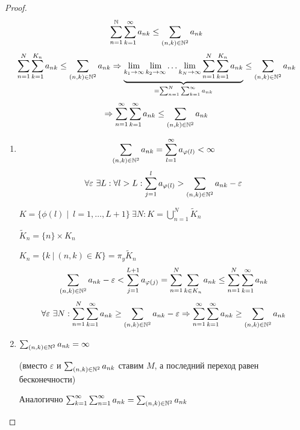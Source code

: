     \begin{proof}
        \[
            \sum_{n=1}^{\mathbb{N}} \sum_{k=1}^\infty a_{nk} \le \sum_{(n, k) \in \mathbb{N}^2} a_{nk}    
        \]
        \[
            \sum_{n=1}^N \sum_{k=1}^{K_n} a_{nk} \le \sum_{(n, k) \in \N^2} a_{nk} \Rightarrow %
            \underbrace{\lim_{k_1\to\infty}\lim_{k_2\to\infty}\dotsc\lim_{k_N\to\infty} \sum^N_{n=1}\sum^{K_n}_{k=1} a_{nk}}_{ = \sum^N_{n=1}\sum^\infty_{k=1}a_{nk}}
            \le \sum_{(n, k) \in \N^2} a_{nk}
        \]
        \[
            \Rightarrow \sum_{n=1}^\infty \sum_{k=1}^\infty a_{nk} \le \sum_{(n, k) \in \mathbb{N}^2} a_{nk}  
        \]

        \begin{enumerate}
            \item \[
                \sum_{(n, k) \in \mathbb{N}^2} a_{nk} = \sum_{l = 1}^\infty a_{\varphi(l)} < \infty    
            \]
            \[
                \forall \varepsilon \ \exists L : \forall l > L : \sum_{j=1}^l a_{\varphi(l)} > \sum_{(n, k) \in \mathbb{N}^2} a_{nk}  - \varepsilon   
            \]
            \par $K = \{\phi(l)\mid \ l = 1, \dots, L + 1\} \ \exists N : K = \bigcup_{n=1}^N \widetilde K_n$
            \par $\widetilde K_n = \{n\} \times K_n$
            \par $K_n = \{k \ | \ (n, k) \in K\} = \pi_y \widetilde K_n$
            \[
                \sum_{(n, k) \in \mathbb{N}^2}a_{nk} - \varepsilon< \sum_{j=1}^{L+1} a_{\varphi(j)} = \sum_{n=1}^N \sum_{k \in K_n} a_{nk} \le \sum_{n=1}^N \sum_{k=1}^\infty a_{nk}   
            \]
            \[
                \forall \varepsilon \ \exists N : \sum_{n=1}^N \sum_{k=1}^\infty a_{nk} \ge \sum_{(n, k) \in \mathbb{N}^2} a_{nk} - \varepsilon \Rightarrow \sum_{n=1}^\infty \sum_{k=1}^\infty a_{nk} \ge \sum_{(n, k) \in \mathbb{N}^2} a_{nk}
            \]
            \item $\sum_{(n,k) \in\mathbb{N}^2} a_{nk} = \infty$

            (вместо $\varepsilon$ и $\sum_{(n,k)\in\mathbb{N}^2}a_{nk}$ ставим $M$, а последний переход равен бесконечности)
        
            Аналогично $\sum^\infty_{k=1}\sum^\infty_{n=1}a_{nk} = \sum_{(n,k)\in\mathbb{N}^2} a_{nk}$
        \end{enumerate}
    \end{proof}

